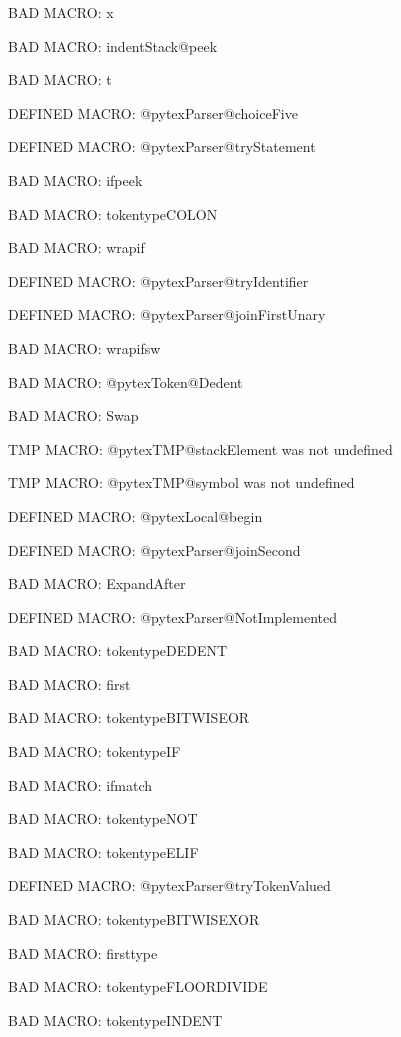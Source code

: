 BAD MACRO: x

BAD MACRO: indentStack@peek

BAD MACRO: t

\ifx\@pytexParser@choiceFive\undefined\else DEFINED MACRO: @pytexParser@choiceFive
\fi

\ifx\@pytexParser@tryStatement\undefined\else DEFINED MACRO: @pytexParser@tryStatement
\fi

BAD MACRO: ifpeek

BAD MACRO: tokentypeCOLON

BAD MACRO: wrapif

\ifx\@pytexParser@tryIdentifier\undefined\else DEFINED MACRO: @pytexParser@tryIdentifier
\fi

\ifx\@pytexParser@joinFirstUnary\undefined\else DEFINED MACRO: @pytexParser@joinFirstUnary
\fi

BAD MACRO: wrapifsw

BAD MACRO: @pytexToken@Dedent

BAD MACRO: Swap

\ifx\@pytexTMP@stackElement\undefined\else TMP MACRO: @pytexTMP@stackElement was not undefined
\fi

\ifx\@pytexTMP@symbol\undefined\else TMP MACRO: @pytexTMP@symbol was not undefined
\fi

\ifx\@pytexLocal@begin\undefined\else DEFINED MACRO: @pytexLocal@begin
\fi

\ifx\@pytexParser@joinSecond\undefined\else DEFINED MACRO: @pytexParser@joinSecond
\fi

BAD MACRO: ExpandAfter

\ifx\@pytexParser@NotImplemented\undefined\else DEFINED MACRO: @pytexParser@NotImplemented
\fi

BAD MACRO: tokentypeDEDENT

BAD MACRO: first

BAD MACRO: tokentypeBITWISEOR

BAD MACRO: tokentypeIF

BAD MACRO: ifmatch

BAD MACRO: tokentypeNOT

BAD MACRO: tokentypeELIF

\ifx\@pytexParser@tryTokenValued\undefined\else DEFINED MACRO: @pytexParser@tryTokenValued
\fi

BAD MACRO: tokentypeBITWISEXOR

BAD MACRO: firsttype

BAD MACRO: tokentypeFLOORDIVIDE

BAD MACRO: tokentypeINDENT

